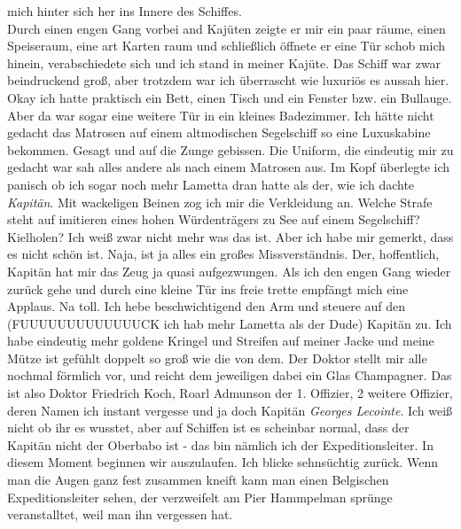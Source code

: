 \documentclass{article}
\begin{document}
mich hinter sich her ins Innere des Schiffes.
\\
\noindent 
Durch einen engen Gang vorbei and Kajüten zeigte er mir ein paar räume, einen Speiseraum, eine art Karten raum
und schließlich öffnete er eine Tür schob mich hinein, verabschiedete sich und ich stand in meiner Kajüte. Das
Schiff war zwar beindruckend groß, aber trotzdem war ich überrascht wie luxuriös es aussah hier. Okay ich hatte
praktisch ein Bett, einen Tisch und ein Fenster bzw. ein Bullauge. Aber da war sogar eine weitere Tür in ein
kleines Badezimmer. Ich hätte nicht gedacht das Matrosen auf einem altmodischen Segelschiff so eine Luxuskabine
bekommen. Gesagt und auf die Zunge gebissen. Die Uniform, die eindeutig mir zu gedacht war sah alles andere als
nach einem Matrosen aus. Im Kopf überlegte ich panisch ob ich sogar noch mehr Lametta dran hatte als der, wie
ich dachte \textit{Kapitän}. Mit wackeligen Beinen zog ich mir die Verkleidung an. Welche Strafe steht auf
imitieren eines hohen Würdenträgers zu See auf einem Segelschiff? Kielholen? Ich weiß zwar nicht mehr was das
ist. Aber ich habe mir gemerkt, dass es nicht schön ist. Naja, ist ja alles ein großes Missverständnis. Der,
hoffentlich, Kapitän hat mir das Zeug ja quasi aufgezwungen. Als ich den engen Gang wieder zurück gehe und durch
eine kleine Tür ins freie trette empfängt mich eine Applaus. Na toll. Ich hebe beschwichtigend den Arm und
steuere auf den (FUUUUUUUUUUUUUCK ich hab mehr Lametta als der Dude) Kapitän zu. Ich habe eindeutig mehr goldene
Kringel und Streifen auf meiner Jacke und meine Mütze ist gefühlt doppelt so groß wie die von dem. Der Doktor
stellt mir alle nochmal förmlich vor, und reicht dem jeweiligen dabei ein Glas Champagner. Das ist also Doktor
Friedrich Koch, Roarl Admunson der 1. Offizier, 2 weitere Offizier, deren Namen ich instant vergesse und ja doch
Kapitän \textit{Georges Lecointe}. Ich weiß nicht ob ihr es wusstet, aber auf Schiffen ist es scheinbar normal,
dass der Kapitän nicht der Oberbabo ist - das bin nämlich ich der Expeditionsleiter. In diesem Moment beginnen
wir auszulaufen.
Ich blicke sehnsüchtig zurück. Wenn man die Augen ganz fest zusammen kneift kann man einen Belgischen
Expeditionsleiter sehen, der verzweifelt am Pier Hammpelman sprünge veranstalltet, weil man ihn vergessen hat.
\\
\end{document}
